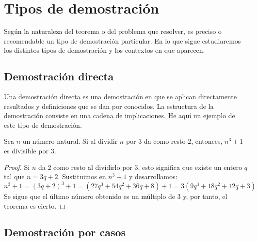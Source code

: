 \section{Tipos de demostración}

Según la naturaleza del teorema o del problema que resolver, es preciso o recomendable un tipo de demostración particular.
En lo que sigue estudiaremos los distintos tipos de demostración y los contextos en que aparecen.

\subsection{Demostración directa}

Una demostración directa es una demostración en que se aplican directamente resultados y definiciones que se dan por conocidos.
La estructura de la demostración consiste en una cadena de implicaciones.
He aquí un ejemplo de este tipo de demostración.

\begin{theorem}
    Sea $n$ un número natural.
    Si al dividir $n$ por 3 da como resto 2, entonces, $n^3 + 1$ es divisible por 3.
\end{theorem}
\begin{proof}
    Si $n$ da 2 como resto al dividirlo por 3, esto significa que existe un entero $q$ tal que $n = 3q + 2$.
    Sustituimos en $n^3 + 1$ y desarrollamos:
    \[
        n^3 + 1 = (3q + 2)^3 + 1 = (27q^3 + 54q^2 + 36q + 8)+ 1 = 3(9q^3 + 18q^2 + 12q + 3)
    \]
    Se sigue que el último número obtenido es un múltiplo de 3 y, por tanto, el teorema es cierto.
\end{proof}

\subsection{Demostración por casos}

